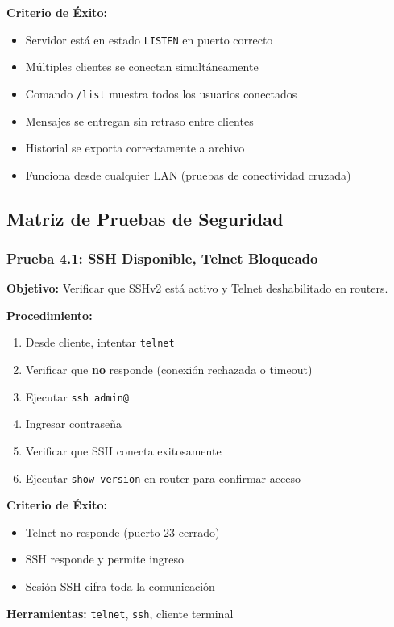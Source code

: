 \textbf{Criterio de Éxito:}
\begin{itemize}
\item Servidor está en estado \texttt{LISTEN} en puerto correcto
\item Múltiples clientes se conectan simultáneamente
\item Comando \texttt{/list} muestra todos los usuarios conectados
\item Mensajes se entregan sin retraso entre clientes
\item Historial se exporta correctamente a archivo
\item Funciona desde cualquier LAN (pruebas de conectividad cruzada)
\end{itemize}


\subsection{Matriz de Pruebas de Seguridad}

\subsubsection{Prueba 4.1: SSH Disponible, Telnet Bloqueado}

\textbf{Objetivo:} Verificar que SSHv2 está activo y Telnet deshabilitado en routers.

\textbf{Procedimiento:}
\begin{enumerate}
\item Desde cliente, intentar \texttt{telnet }
\item Verificar que \textbf{no} responde (conexión rechazada o timeout)
\item Ejecutar \texttt{ssh admin@\ipRouterUno}
\item Ingresar contraseña
\item Verificar que SSH conecta exitosamente
\item Ejecutar \texttt{show version} en router para confirmar acceso
\end{enumerate}

\textbf{Criterio de Éxito:}
\begin{itemize}
\item Telnet no responde (puerto 23 cerrado)
\item SSH responde y permite ingreso
\item Sesión SSH cifra toda la comunicación
\end{itemize}

\textbf{Herramientas:} \texttt{telnet}, \texttt{ssh}, cliente terminal

